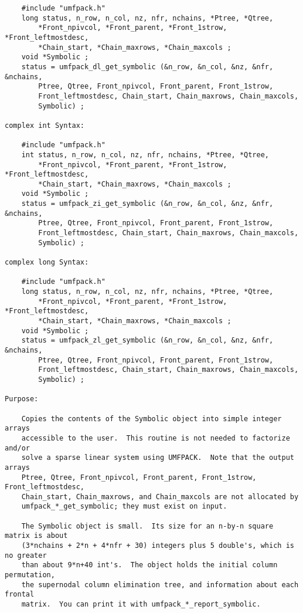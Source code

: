 {\begin{verbatim}
    #include "umfpack.h"
    long status, n_row, n_col, nz, nfr, nchains, *Ptree, *Qtree,
        *Front_npivcol, *Front_parent, *Front_1strow, *Front_leftmostdesc,
        *Chain_start, *Chain_maxrows, *Chain_maxcols ;
    void *Symbolic ;
    status = umfpack_dl_get_symbolic (&n_row, &n_col, &nz, &nfr, &nchains,
        Ptree, Qtree, Front_npivcol, Front_parent, Front_1strow,
        Front_leftmostdesc, Chain_start, Chain_maxrows, Chain_maxcols,
        Symbolic) ;

complex int Syntax:

    #include "umfpack.h"
    int status, n_row, n_col, nz, nfr, nchains, *Ptree, *Qtree,
        *Front_npivcol, *Front_parent, *Front_1strow, *Front_leftmostdesc,
        *Chain_start, *Chain_maxrows, *Chain_maxcols ;
    void *Symbolic ;
    status = umfpack_zi_get_symbolic (&n_row, &n_col, &nz, &nfr, &nchains,
        Ptree, Qtree, Front_npivcol, Front_parent, Front_1strow,
        Front_leftmostdesc, Chain_start, Chain_maxrows, Chain_maxcols,
        Symbolic) ;

complex long Syntax:

    #include "umfpack.h"
    long status, n_row, n_col, nz, nfr, nchains, *Ptree, *Qtree,
        *Front_npivcol, *Front_parent, *Front_1strow, *Front_leftmostdesc,
        *Chain_start, *Chain_maxrows, *Chain_maxcols ;
    void *Symbolic ;
    status = umfpack_zl_get_symbolic (&n_row, &n_col, &nz, &nfr, &nchains,
        Ptree, Qtree, Front_npivcol, Front_parent, Front_1strow,
        Front_leftmostdesc, Chain_start, Chain_maxrows, Chain_maxcols,
        Symbolic) ;

Purpose:

    Copies the contents of the Symbolic object into simple integer arrays
    accessible to the user.  This routine is not needed to factorize and/or
    solve a sparse linear system using UMFPACK.  Note that the output arrays
    Ptree, Qtree, Front_npivcol, Front_parent, Front_1strow, Front_leftmostdesc,
    Chain_start, Chain_maxrows, and Chain_maxcols are not allocated by
    umfpack_*_get_symbolic; they must exist on input.

    The Symbolic object is small.  Its size for an n-by-n square matrix is about
    (3*nchains + 2*n + 4*nfr + 30) integers plus 5 double's, which is no greater
    than about 9*n+40 int's.  The object holds the initial column permutation,
    the supernodal column elimination tree, and information about each frontal
    matrix.  You can print it with umfpack_*_report_symbolic.


\end{verbatim}}
